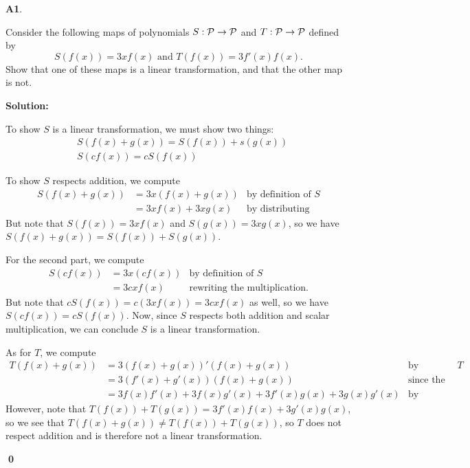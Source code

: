 \documentclass{article}
\newenvironment{problem}[1]
{
  \begin{flushleft}
  \textbf{#1}.
  \ignorespaces
}
{
  \end{flushleft}
}
\newenvironment{solution}
{
  \ignorespaces
  \textbf{Solution:}
}
{
  \ignorespacesafterend
  \begin{flushright}
  {\bfseries \qed}
  \end{flushright}
}
\begin{document}
\begin{problem}{A1}
Consider the following maps of polynomials \(S: \P \rightarrow \P\)
and \(T:\P\rightarrow\P\) defined by
\[S(f(x))= 3xf(x) \text{ and }T(f(x)) = 3f'(x)f(x).\]
Show that one of these maps is a linear transformation, and that the other
map is not.
\end{problem}
\begin{solution}
To show \(S\) is a linear transformation, we must show two things:
\begin{align*}
&S\left(f(x)+g(x)\right)=S(f(x))+s(g(x)) \\
&S(cf(x)) = cS(f(x))
\end{align*}

To show \(S\) respects addition, we compute
\begin{align*}
S\left(f(x)+g(x)\right) &= 3x\left(f(x)+g(x)\right) & \text{by definition of \(S\)} \\
&= 3xf(x)+3xg(x) & \text{by distributing}
\end{align*}
But note that \(S(f(x))=3xf(x)\) and \(S(g(x))=3xg(x)\), so we have \(S(f(x)+g(x))=S(f(x))+S(g(x))\).

For the second part, we compute
\begin{align*}
S\left(cf(x)\right) &= 3x\left(cf(x)\right) & \text{by definition of \(S\)} \\
&= 3cxf(x) & \text{rewriting the multiplication.}
\end{align*}
But note that \(cS(f(x))=c(3xf(x))=3cxf(x)\) as well, so we have \(S(cf(x))=cS(f(x))\).  Now, since \(S\) respects both addition and scalar multiplication, we can conclude \(S\) is a linear transformation.

As for \(T\), we compute
  \begin{align*}
  T(f(x)+g(x))& =3 (f(x)+g(x))'(f(x)+g(x)) &\text{by definition of \(T\)} \\
  &= 3(f'(x)+g'(x))(f(x)+g(x)) & \text{since the derivative is linear} \\
  &= 3f(x)f'(x)+3f(x)g'(x)+3f'(x)g(x)+3g(x)g'(x) &\text{by distributing}
  \end{align*}
However, note that \(T(f(x))+T(g(x))=3f'(x)f(x)+3g'(x)g(x)\), so we see that \(T(f(x)+g(x)) \neq T(f(x))+T(g(x))\), so \(T\) does not respect addition and is therefore not a linear transformation.
\end{solution}
\end{document}
